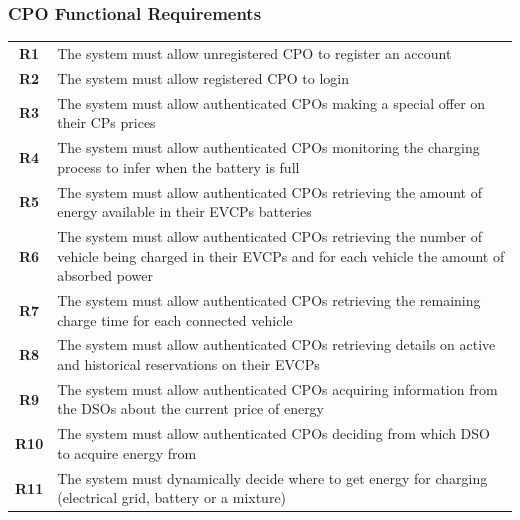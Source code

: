 \subsubsection{CPO Functional Requirements}
\begin{table}[H]
    \begin{tabularx}{\textwidth}{cX}
        \toprule
        \textbf{R1}  & The system must allow unregistered CPO to register an account                                                                                            \\
        \textbf{R2}  & The system must allow registered CPO to login                                                                                                            \\
        \textbf{R3}  & The system must allow authenticated CPOs making a special offer on their CPs prices                                                                      \\
        \textbf{R4}  & The system must allow authenticated CPOs monitoring the charging process to infer when the battery is full                                               \\
        \textbf{R5}  & The system must allow authenticated CPOs retrieving the amount of energy available in their EVCPs batteries                                              \\
        \textbf{R6}  & The system must allow authenticated CPOs retrieving the number of vehicle being charged in their EVCPs and for each vehicle the amount of absorbed power \\
        \textbf{R7}  & The system must allow authenticated CPOs retrieving the remaining charge time for each connected vehicle                                                 \\
        \textbf{R8}  & The system must allow authenticated CPOs retrieving details on active and historical reservations on their EVCPs                                         \\
        \textbf{R9}  & The system must allow authenticated CPOs acquiring information from the DSOs about the current price of energy                                           \\
        \textbf{R10} & The system must allow authenticated CPOs deciding from which DSO to acquire energy from                                                                  \\
        \textbf{R11} & The system must dynamically decide where to get energy for charging (electrical grid, battery or a mixture)                                              \\

\end{tabularx}
\end{table}
